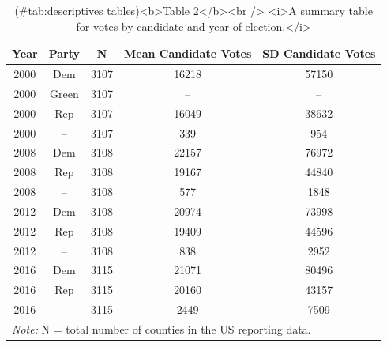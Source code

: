 \documentclass[
  english,
  man]{apa6}
\begin{document}
\begin{table}

\caption{(\#tab:descriptives tables)<b>Table 2</b><br /> <i>A summary table for votes by candidate and year of election.</i>}
\centering
\begin{tabular}[t]{c|c|c|c|c}
\hline
Year & Party & N & Mean Candidate Votes & SD Candidate Votes\\
\hline
2000 & Dem & 3107 & 16218 & 57150\\
\hline
2000 & Green & 3107 & -- & --\\
\hline
2000 & Rep & 3107 & 16049 & 38632\\
\hline
2000 & -- & 3107 & 339 & 954\\
\hline
2008 & Dem & 3108 & 22157 & 76972\\
\hline
2008 & Rep & 3108 & 19167 & 44840\\
\hline
2008 & -- & 3108 & 577 & 1848\\
\hline
2012 & Dem & 3108 & 20974 & 73998\\
\hline
2012 & Rep & 3108 & 19409 & 44596\\
\hline
2012 & -- & 3108 & 838 & 2952\\
\hline
2016 & Dem & 3115 & 21071 & 80496\\
\hline
2016 & Rep & 3115 & 20160 & 43157\\
\hline
2016 & -- & 3115 & 2449 & 7509\\
\hline
\multicolumn{5}{l}{\rule{0pt}{1em}\textit{Note: } N = total number of counties in the US reporting data.}\\
\end{tabular}
\end{table}
\end{document}
